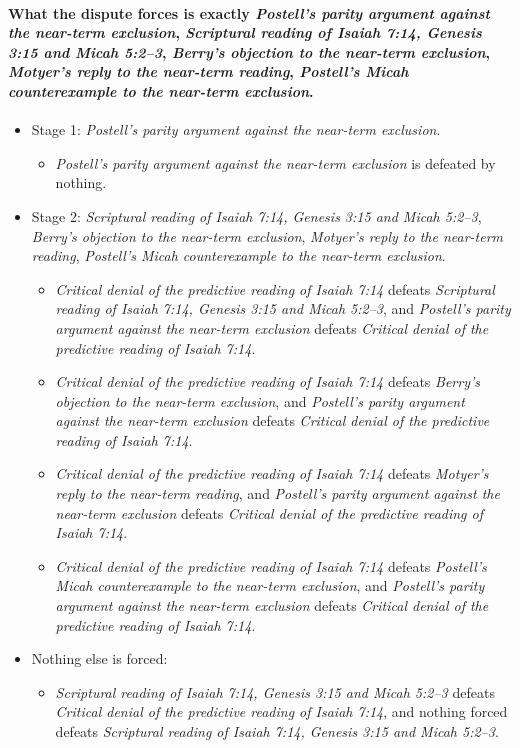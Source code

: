 \documentclass[11pt]{article}
\begin{document}
\paragraph{What the dispute forces is exactly \emph{Postell’s parity argument against the near-term exclusion}, \emph{Scriptural reading of Isaiah 7:14, Genesis 3:15 and Micah 5:2–3}, \emph{Berry’s objection to the near-term exclusion}, \emph{Motyer’s reply to the near-term reading}, \emph{Postell’s Micah counterexample to the near-term exclusion}.}
\begin{itemize}
\item Stage 1: \emph{Postell’s parity argument against the near-term exclusion}.
\begin{itemize}
\item \emph{Postell’s parity argument against the near-term exclusion} is defeated by nothing.
\end{itemize}
\item Stage 2: \emph{Scriptural reading of Isaiah 7:14, Genesis 3:15 and Micah 5:2–3}, \emph{Berry’s objection to the near-term exclusion}, \emph{Motyer’s reply to the near-term reading}, \emph{Postell’s Micah counterexample to the near-term exclusion}.
\begin{itemize}
\item \emph{Critical denial of the predictive reading of Isaiah 7:14} defeats \emph{Scriptural reading of Isaiah 7:14, Genesis 3:15 and Micah 5:2–3}, and \emph{Postell’s parity argument against the near-term exclusion} defeats \emph{Critical denial of the predictive reading of Isaiah 7:14}.
\item \emph{Critical denial of the predictive reading of Isaiah 7:14} defeats \emph{Berry’s objection to the near-term exclusion}, and \emph{Postell’s parity argument against the near-term exclusion} defeats \emph{Critical denial of the predictive reading of Isaiah 7:14}.
\item \emph{Critical denial of the predictive reading of Isaiah 7:14} defeats \emph{Motyer’s reply to the near-term reading}, and \emph{Postell’s parity argument against the near-term exclusion} defeats \emph{Critical denial of the predictive reading of Isaiah 7:14}.
\item \emph{Critical denial of the predictive reading of Isaiah 7:14} defeats \emph{Postell’s Micah counterexample to the near-term exclusion}, and \emph{Postell’s parity argument against the near-term exclusion} defeats \emph{Critical denial of the predictive reading of Isaiah 7:14}.
\end{itemize}
\item Nothing else is forced:
\begin{itemize}
\item \emph{Scriptural reading of Isaiah 7:14, Genesis 3:15 and Micah 5:2–3} defeats \emph{Critical denial of the predictive reading of Isaiah 7:14}, and nothing forced defeats \emph{Scriptural reading of Isaiah 7:14, Genesis 3:15 and Micah 5:2–3}.
\end{itemize}
\end{itemize}
\end{document}
